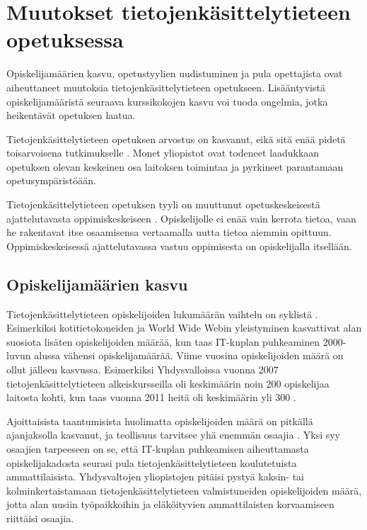 \documentclass[finnish]{tktltiki2}
\theoremstyle{definition}
\theoremstyle{remark}
\begin{document}
\section{Muutokset tietojenkäsittelytieteen opetuksessa}

Opiskelijamäärien kasvu, opetustyylien uudistuminen ja pula opettajista ovat aiheuttaneet muutoksia tie\-to\-jen\-kä\-sit\-te\-ly\-tie\-teen opetukseen. Lisääntyvistä opiskelijamääristä seuraava kurssikokojen kasvu voi tuoda ongelmia, jotka heikentävät opetuksen laatua.  \par

Tie\-to\-jen\-kä\-sit\-te\-ly\-tie\-teen opetuksen arvostus on kasvanut, eikä sitä enää pidetä toisarvoisena tutkimukselle \cite{Biggs07}. Monet yliopistot ovat todeneet laadukkaan opetuksen olevan keskeinen osa laitoksen toimintaa ja pyrkineet parantamaan opetusympäristöään. \par

Tietojenkäsittelytieteen opetuksen tyyli on muuttunut opetuskeskeisestä ajattelutavasta oppimiskeskeiseen \cite{Yadin11}. Opiskelijolle ei enää vain kerrota tietoa, vaan he rakentavat itse osaamisensa vertaamalla uutta tietoa aiemmin opittuun. Oppimiskeskeisessä ajattelutavassa vastuu oppimisesta on opiskelijalla itsellään. \par


\subsection{Opiskelijamäärien kasvu}
Tietojenkäsittelytieteen opiskelijoiden lukumäärän vaihtelu on syklistä \cite{Roberts11}. Esimerkiksi kotitietokoneiden ja World Wide Webin yleistyminen kasvattivat alan suosiota lisäten opiskelijoiden määrää, kun taas IT-kuplan puhkeaminen 2000-luvun alussa vähensi opiskelijamäärää. Viime vuosina opiskelijoiden määrä on ollut jälleen kasvussa. Esimerkiksi Yhdysvalloissa vuonna 2007 tie\-to\-jen\-kä\-sit\-te\-ly\-tie\-teen alkeiskursseilla oli keskimäärin noin 200 opiskelijaa laitosta kohti, kun taas vuonna 2011 heitä oli keskimäärin yli 300 \cite{TaulbeeReport}.  \par

Ajoittaisista taantumisista huolimatta opiskelijoiden määrä on pitkällä ajanjaksolla kasvanut, ja teollisuus tarvitsee yhä enemmän osaajia \cite{Roberts11}. Yksi syy osaajien tarpeeseen on se, että IT-kuplan puhkeamisen aiheuttamasta opiskelijakadosta seurasi pula tie\-to\-jen\-kä\-sit\-te\-ly\-tie\-teen koulutetuista ammattilaisista. Yhdysvaltojen yliopistojen pitäisi pystyä kaksin- tai kolminkertaistamaan tie\-to\-jen\-kä\-sit\-te\-ly\-tie\-teen valmistuneiden opiskelijoiden määrä, jotta alan uusiin työpaikkoihin ja eläköityvien ammattilaisten korvaamiseen riittäisi osaajia.  \par
\end{document}
